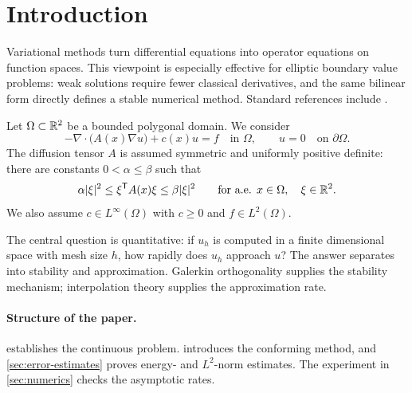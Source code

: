 \section{Introduction}
\label{sec:introduction}

Variational methods turn differential equations into operator equations on
function spaces. This viewpoint is especially effective for elliptic boundary
value problems: weak solutions require fewer classical derivatives, and the
same bilinear form directly defines a stable numerical method. Standard
references include \cite{ciarlet1978,brenner2008,ern2004}.

Let $\Omega\subset\mathbb{R}^2$ be a bounded polygonal domain. We consider
\begin{equation}
  -\nabla\!\cdot\!\bigl(A(x)\nabla u\bigr)+c(x)u=f
  \quad\text{in }\Omega,
  \qquad
  u=0
  \quad\text{on }\partial\Omega.
  \label{eq:strong-problem}
\end{equation}
The diffusion tensor $A$ is assumed symmetric and uniformly positive definite:
there are constants $0<\alpha\leq\beta$ such that
\begin{equation}
  \alpha\lvert\xi\rvert^2
  \leq \xi^{\mathsf T}A(x)\xi
  \leq \beta\lvert\xi\rvert^2
  \qquad
  \text{for a.e. }x\in\Omega,
  \quad \xi\in\mathbb{R}^2.
  \label{eq:uniform-ellipticity}
\end{equation}
We also assume $c\in L^\infty(\Omega)$ with $c\geq0$ and
$f\in L^2(\Omega)$.

The central question is quantitative: if $u_h$ is computed in a finite
dimensional space with mesh size $h$, how rapidly does $u_h$ approach $u$?
The answer separates into stability and approximation. Galerkin
orthogonality supplies the stability mechanism; interpolation theory supplies
the approximation rate.

\paragraph{Structure of the paper.}
 establishes the continuous problem.
 introduces the conforming method, and
\cref{sec:error-estimates} proves energy- and $L^2$-norm estimates.
The experiment in \cref{sec:numerics} checks the asymptotic rates.

